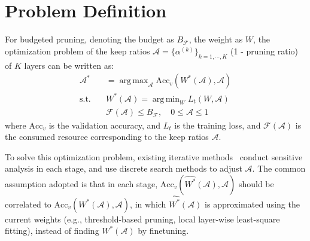 \documentclass[runningheads]{llncs}
\newcommand{\flops}{\mathcal{F}}
\DeclareMathOperator*{\argmax}{arg\,max}
\DeclareMathOperator*{\argmin}{arg\,min}
\newcommand{\alphas}{\mathcal{A}}
\begin{document}
    




  \section{Problem Definition}
  \label{sec:pd}
  
  For budgeted pruning, denoting the budget as $B_\flops$, the weight as $W$, the optimization problem of the keep ratios $\alphas = \{\alpha^{(k)}\}_{k=1,\cdots,K}$ (1 - pruning ratio) of $K$ layers can be written as:
  \begin{equation}
    \begin{aligned}
      \alphas^{*} &= \argmax_{\alphas} \mbox{Acc}_v(W^*(\alphas), \alphas)\\
      \mbox{s.t.}\quad & W^*(\alphas) = \argmin_{W} L_t(W, \alphas)\\
      & \flops(\alphas) \leq B_\flops, \quad 0 \leq \alphas \leq 1
    \end{aligned}
    \label{eq:pd}
  \end{equation}
  where $\mbox{Acc}_v$ is the validation accuracy, and $L_t$ is the training loss, and $\flops(\alphas)$ is the consumed resource corresponding to the keep ratios $\alphas$.
  
  To solve this optimization problem, existing iterative methods~\cite{netadapt,amc,autocompress} conduct sensitive analysis in each stage, and use discrete search methods to adjust $\alphas$. The common assumption adopted is that in each stage, $\mbox{Acc}_v(\hat{W^*}(\alphas), \alphas)$ should be correlated to $\mbox{Acc}_v(W^*(\alphas), \alphas)$, in which $\hat{W^*}(\alphas)$ is approximated using the current weights (e.g., threshold-based pruning, local layer-wise least-square fitting), instead of finding $W^*(\alphas)$ by finetuning. 
  
\end{document}
